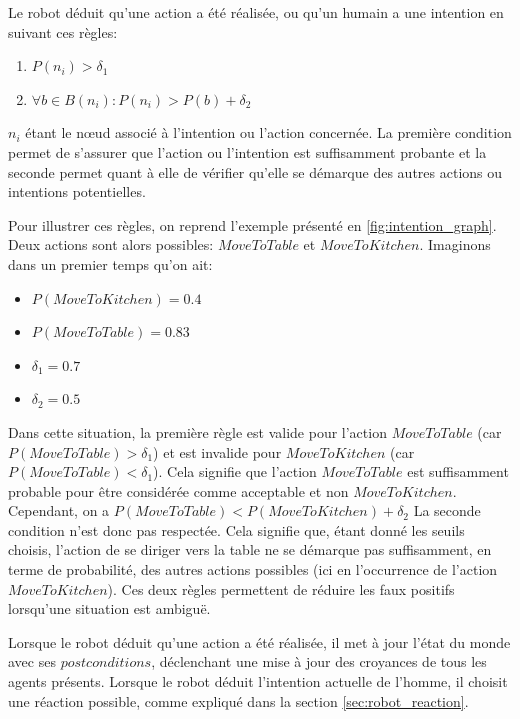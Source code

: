 \documentclass[a4paper,11pt,twoside]{StyleThese}
\begin{document}
Le robot déduit qu'une action a été réalisée, ou qu'un humain a une intention en suivant ces règles:

\begin{enumerate}
\item \(P(n_i)>\delta_1\) 
\item \(\forall b \in B(n_i): P(n_i)>P(b)+\delta_2\)
\end{enumerate}

$n_i$ étant le nœud associé à l'intention ou l'action concernée.
La première condition permet de s'assurer que l'action ou l'intention est suffisamment probante et la seconde permet quant à elle de vérifier qu'elle se démarque des autres actions ou intentions potentielles.

Pour illustrer ces règles, on reprend l'exemple présenté en \ref{fig:intention_graph}.
Deux actions sont alors possibles: $MoveToTable$ et $MoveToKitchen$.
Imaginons dans un premier temps qu'on ait:

\begin{itemize}
\item $P(MoveToKitchen) = 0.4$
\item $P(MoveToTable) = 0.83$
\item $\delta_1 = 0.7$
\item $\delta_2 = 0.5$
\end{itemize}

Dans cette situation, la première règle est valide pour l'action $MoveToTable$ (car $P(MoveToTable) > \delta_1$) et est invalide pour $MoveToKitchen$ (car $P(MoveToTable) < \delta_1$). Cela signifie que l'action $MoveToTable$ est suffisamment probable pour être considérée comme acceptable et non $MoveToKitchen$. Cependant, on a  $P(MoveToTable)<P(MoveToKitchen)+\delta_2$ La seconde condition n'est donc pas respectée. Cela signifie que, étant donné les seuils choisis, l'action de se diriger vers la table ne se démarque pas suffisamment, en terme de probabilité, des autres actions possibles (ici en l'occurrence de l'action $MoveToKitchen$).
Ces deux règles permettent de réduire les faux positifs lorsqu'une situation est ambiguë.

Lorsque le robot déduit qu'une action a été réalisée, il met à jour l'état du monde avec ses $postconditions$, déclenchant une mise à jour des croyances de tous les agents présents. Lorsque le robot déduit l'intention actuelle de l'homme, il choisit une réaction possible, comme expliqué dans la section \ref{sec:robot_reaction}.
\end{document}
